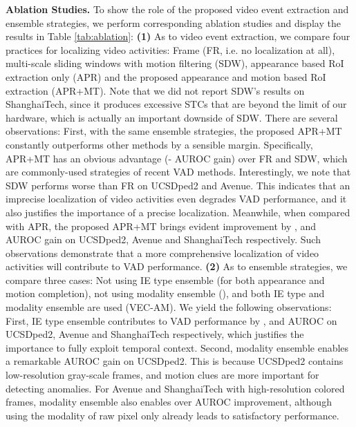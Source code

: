 \documentclass[sigconf]{acmart}
\begin{document}
\textbf{Ablation Studies.} To show the role of the proposed video event extraction and ensemble strategies, we perform corresponding ablation studies and display the results in Table \ref{tab:ablation}: \textbf{(1)} As to video event extraction, we compare four practices for localizing video activities: Frame (FR, i.e. no localization at all), multi-scale sliding windows with motion filtering (SDW), appearance based RoI extraction only (APR) and the proposed appearance and motion based RoI extraction (APR+MT). Note that we did not report SDW's results on ShanghaiTech, since it produces excessive STCs that are beyond the limit of our hardware, which is actually an important downside of SDW. There are several observations: First, with the same ensemble strategies, the proposed APR+MT constantly outperforms other methods by a sensible margin. Specifically, APR+MT has an obvious advantage (- AUROC gain) over FR and SDW, which are commonly-used strategies of recent VAD methods. Interestingly, we note that SDW performs worse than FR on UCSDped2 and Avenue. This indicates that an imprecise localization of video activities even degrades VAD performance, and it also justifies the importance of a precise localization. Meanwhile, when compared with APR, the proposed APR+MT brings evident improvement by ,  and  AUROC gain on UCSDped2, Avenue and ShanghaiTech respectively. Such observations demonstrate that a more comprehensive localization of video activities will contribute to VAD performance. \textbf{(2)} As to ensemble strategies, we compare three cases: Not using IE type ensemble (for both appearance and motion completion), not using modality ensemble (), and both IE type and modality ensemble are used (VEC-AM). We yield the following observations: First, IE type ensemble contributes to VAD performance by ,  and  AUROC on UCSDped2, Avenue and ShanghaiTech respectively, which justifies the importance to fully exploit temporal context. Second, modality ensemble enables a remarkable  AUROC gain on UCSDped2. This is because UCSDped2 contains low-resolution gray-scale frames, and motion clues are more important for detecting anomalies. For Avenue and ShanghaiTech with high-resolution colored frames, modality ensemble also enables over  AUROC improvement, although using the modality of raw pixel only already leads to satisfactory performance.
\end{document}
